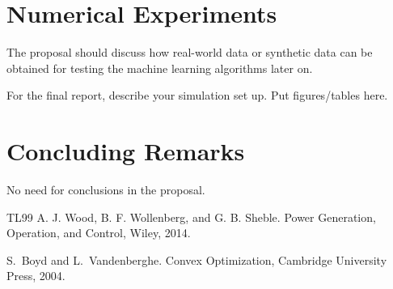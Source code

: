 \documentclass[11pt]{article}
\begin{document}
\section{Numerical Experiments}\label{sec:tests}
The proposal should discuss how real-world data or synthetic data can be obtained for testing the machine learning algorithms later on. 

For the final report, describe your simulation set up. Put figures/tables here.


\section{Concluding Remarks}\label{sec:conclusions}

No need for conclusions in the proposal.


\begin{thebibliography} {TL99}
	 {\sc A. J. Wood, B. F. Wollenberg, and G. B. Sheble.} Power Generation, Operation, and Control, Wiley, 2014.
	
	 {\sc S.\ Boyd and L.\ Vandenberghe.} Convex Optimization,
	Cambridge University Press, 2004.
\end{thebibliography}
\end{document}
